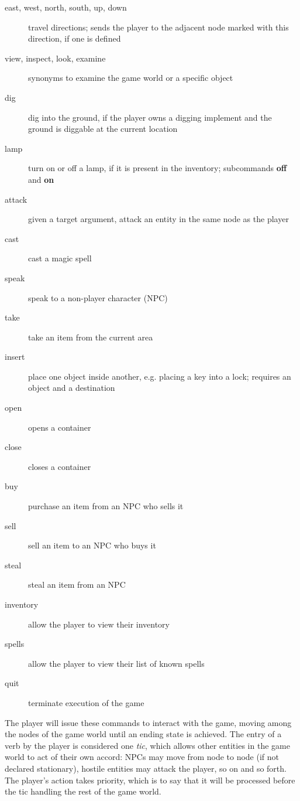 \documentclass[11pt,letterpaper]{article}
\begin{document}
\begin{description}
    \item[east, west, north, south, up, down] travel directions; sends the player to the adjacent node marked with this direction, if one is defined
    \item[view, inspect, look, examine] synonyms to examine the game world or a specific object
    \item[dig] dig into the ground, if the player owns a digging implement and the ground is diggable at the current location
    \item[lamp] turn on or off a lamp, if it is present in the inventory; subcommands {\bf off} and {\bf on}
    \item[attack] given a target argument, attack an entity in the same node as the player
    \item[cast] cast a magic spell
    \item[speak] speak to a non-player character (NPC)
    \item[take] take an item from the current area
    \item[insert] place one object inside another, e.g. placing a key into a lock; requires an object and a destination
    \item[open] opens a container
    \item[close] closes a container
    \item[buy] purchase an item from an NPC who sells it
    \item[sell] sell an item to an NPC who buys it
    \item[steal] steal an item from an NPC
    \item[inventory] allow the player to view their inventory
    \item[spells] allow the player to view their list of known spells
    \item[quit] terminate execution of the game
\end{description}

The player will issue these commands to interact with the game, moving among the nodes of the game world until an ending state is achieved.  The entry of a verb by the player is considered one {\it tic}\label{gameTic}, which allows other entities in the game world to act of their own accord: NPCs may move from node to node (if not declared stationary), hostile entities may attack the player, so on and so forth.  The player's action takes priority, which is to say that it will be processed before the tic handling the rest of the game world.
\end{document}

